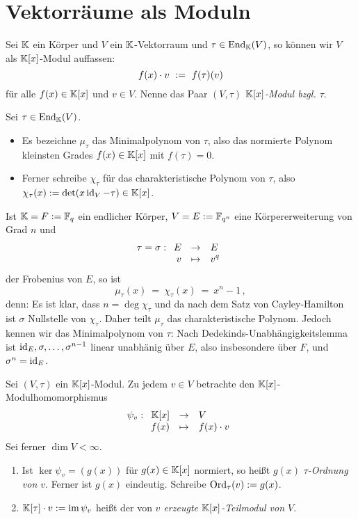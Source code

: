 \section{Vektorräume als Moduln}

\begin{definition}[$(V,\tau)$]
  Sei $\mathbb{K}$ ein Körper und $V$ ein $\mathbb{K}$-Vektorraum und 
  $\tau \in \operatorname{End}_\mathbb{K}(V)$, so können wir $V$ als $\mathbb{K}[x]$-Modul auffassen:
  \[ f(x) \cdot v \ :=\  f(\tau)(v)\]
  für alle $f(x) \in \mathbb{K}[x]$ und $v\in V$.
  Nenne das Paar $(V,\tau)$ \emph{$\mathbb{K}[x]$-Modul bzgl. $\tau$}.
\end{definition}

\begin{notation}
  Sei $\tau\in \operatorname{End}_\mathbb{K}(V)$.
  \begin{itemize}
  \item Es bezeichne $\mu_\tau$ das Minimalpolynom von 
    $\tau$, also das normierte Polynom kleinsten Grades $f(x)\in \mathbb{K}[x]$ mit 
    $f(\tau) = 0$.
  \item Ferner schreibe $\chi_\tau$ für das charakteristische Polynom von 
    $\tau$, also $\chi_\tau(x) := \det(x \operatorname{id}_V - \tau) \in \mathbb{K}[x]$.
  \end{itemize}
\end{notation}


\begin{bemerkung}
  Ist $\mathbb{K}  = F :=\mathbb{F}_q$ ein endlicher Körper, 
  $V = E := \mathbb{F}_{q^n}$ eine Körpererweiterung
  von Grad $n$ und 
  \[\tau = \sigma: \funcdef{E & \to & E\\
    v &\mapsto & v^q}\]
  der Frobenius von $E$, so ist
  \[ \mu_\tau(x) \ =\ \chi_\tau(x) \ =\ x^n - 1\,,\]
  denn: Es ist klar, dass $n = \deg \chi_\tau$ und da nach dem Satz von
  Cayley-Hamilton ist $\sigma$ Nullstelle von $\chi_\tau$. Daher teilt
  $\mu_\tau$ das charakteristische Polynom. Jedoch kennen wir das
  Minimalpolynom von $\tau$: Nach Dedekinds-Unabhängigkeitslemma ist 
  $\operatorname{id}_E,\sigma,\ldots,\sigma^{n-1}$ linear unabhänig über $E$, also insbesondere
  über $F$, und $\sigma^n = \operatorname{id}_E$.
\end{bemerkung}


\begin{definition}
  Sei $(V,\tau)$ ein $\mathbb{K}[x]$-Modul. Zu jedem $v \in V$ betrachte den
  $\mathbb{K}[x]$-Modulhomomorphismus
  \[ \psi_v: \funcdef{\K[x] & \to & V \\
    f(x) & \mapsto & f(x)\cdot v }  \]
  Sei ferner $\dim V < \infty$.
  \begin{enumerate}
    \item Ist $\ker\psi_v = (g(x))$ für $g(x)\in \mathbb{K}[x]$ normiert, so heißt
      $g(x)$ \emph{$\tau$-Ordnung von $v$}\@. Ferner ist $g(x)$ eindeutig.
      Schreibe $\operatorname{Ord}_\tau(v) := g(x)$.
    \item $\mathbb{K}[\tau]\cdot v := \operatorname{im}{\psi_v}$ heißt der von \emph{$v$ erzeugte
      $\mathbb{K}[x]$-Teilmodul von $V$}.
  \end{enumerate}
\end{definition}


